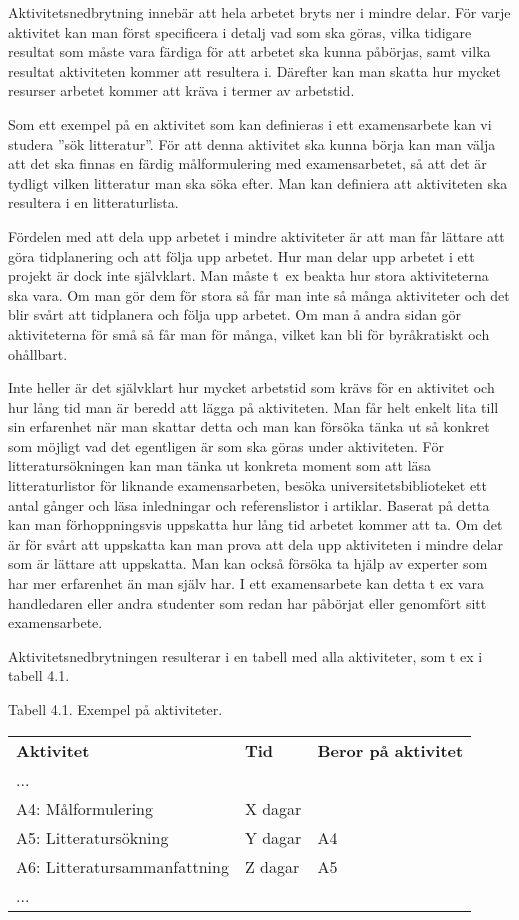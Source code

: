 Aktivitetsnedbrytning innebär att hela arbetet bryts ner i mindre delar.
För varje aktivitet kan man först specificera i detalj vad som ska
göras, vilka tidigare resultat som måste vara färdiga för att arbetet
ska kunna påbörjas, samt vilka resultat aktiviteten kommer att resultera
i. Därefter kan man skatta hur mycket resurser arbetet kommer att kräva
i termer av arbetstid.

Som ett exempel på en aktivitet som kan definieras i ett examensarbete
kan vi studera ''sök litteratur''. För att denna aktivitet ska kunna
börja kan man välja att det ska finnas en färdig målformulering med
examensarbetet, så att det är tydligt vilken litteratur man ska söka
efter. Man kan definiera att aktiviteten ska resultera i en
litteraturlista.

Fördelen med att dela upp arbetet i mindre aktiviteter är att man får
lättare att göra tidplanering och att följa upp arbetet. Hur man delar
upp arbetet i ett projekt är dock inte självklart. Man måste t~ex beakta
hur stora aktiviteterna ska vara. Om man gör dem för stora så får man
inte så många aktiviteter och det blir svårt att tidplanera och följa
upp arbetet. Om man å andra sidan gör aktiviteterna för små så får man
för många, vilket kan bli för byråkratiskt och ohållbart.

Inte heller är det självklart hur mycket arbetstid som krävs för en
aktivitet och hur lång tid man är beredd att lägga på aktiviteten. Man
får helt enkelt lita till sin erfarenhet när man skattar detta och man
kan försöka tänka ut så konkret som möjligt vad det egentligen är som
ska göras under aktiviteten. För litteratursökningen kan man tänka ut
konkreta moment som att läsa litteraturlistor för liknande
examensarbeten, besöka universitetsbiblioteket ett antal gånger och läsa
inledningar och referenslistor i artiklar. Baserat på detta kan man
förhoppningsvis uppskatta hur lång tid arbetet kommer att ta. Om det är
för svårt att uppskatta kan man prova att dela upp aktiviteten i mindre
delar som är lättare att uppskatta. Man kan också försöka ta hjälp av
experter som har mer erfarenhet än man själv har. I ett examensarbete
kan detta t ex vara handledaren eller andra studenter som redan har
påbörjat eller genomfört sitt examensarbete.

Aktivitetsnedbrytningen resulterar i en tabell med alla aktiviteter, som
t ex i tabell 4.1.

Tabell 4.1. Exempel på aktiviteter.

\begin{longtable}[]{@{}lll@{}}
\toprule
\textbf{Aktivitet} & \textbf{Tid} & \textbf{Beror på
aktivitet}\tabularnewline
... & &\tabularnewline
A4: Målformulering & X dagar &\tabularnewline
A5: Litteratursökning & Y dagar & A4\tabularnewline
A6: Litteratursammanfattning & Z dagar & A5\tabularnewline
... & &\tabularnewline
\bottomrule
\end{longtable}

